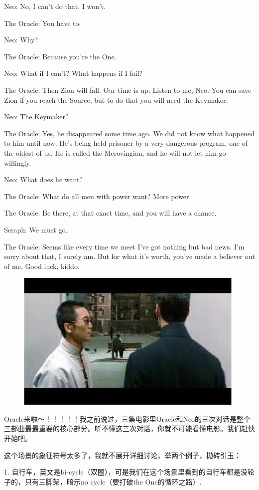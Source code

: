\documentclass{ctexart}
\newenvironment{myquote}{\color{green} \setlength{\leftskip}{6em} \setlength{\rightskip}{4em} \setlength{\parindent}{-2em}}{\par}
\begin{document}
\begin{myquote}
Neo: No, I can't do that. I won't.

The Oracle: You have to.

Neo: Why?

The Oracle: Because you're the One.

Neo: What if I can't? What happens if I fail?

The Oracle: Then Zion will fall. Our time is up. Listen to me, Neo. You can save Zion if you reach the Source, but to do that you will need the Keymaker.

Neo: The Keymaker?

The Oracle: Yes, he disappeared some time ago. We did not know what happened to him until now. He's being held prisoner by a very dangerous program, one of the oldest of us. He is called the Merovingian, and he will not let him go willingly.

Neo: What does he want?

The Oracle: What do all men with power want? More power.

The Oracle: Be there, at that exact time, and you will have a chance.

Seraph: We must go.

The Oracle: Seems like every time we meet I've got nothing but bad news. I'm sorry about that, I surely am. But for what it's worth, you've made a believer out of me. Good luck, kiddo.
\end{myquote}

\begin{figure}[htb]
\centering
\includegraphics[width=0.5\linewidth]{fig/read_reloaded-64}
\end{figure}

Oracle来啦～！！！！！我之前说过，三集电影里Oracle和Neo的三次对话是整个三部曲最最重要的核心部分。听不懂这三次对话，你就不可能看懂电影。我们赶快开始吧。

这个场景的象征符号太多了，我就不展开详细讨论，举两个例子，拋砖引玉：

1. 自行车，英文是bi-cycle（双圈），可是我们在这个场景里看到的自行车都是没轮子的，只有三脚架，暗示no cycle（要打破the One的循环之路）.
\end{document}
